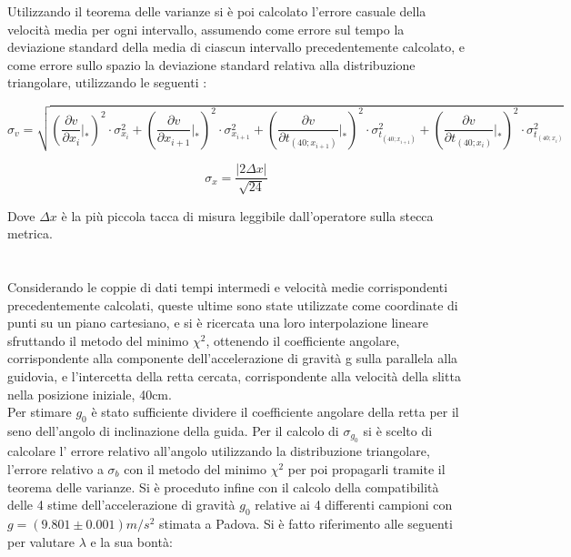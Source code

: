 \documentclass[a4paper,11pt,oneside]{article}
\begin{document}
Utilizzando il teorema delle varianze si è poi calcolato l'errore casuale della velocità media per ogni intervallo, assumendo come errore sul tempo la deviazione standard della media di ciascun intervallo precedentemente calcolato, e come errore sullo spazio la deviazione standard relativa alla distribuzione triangolare, utilizzando le seguenti :

\begin{equation*}\label{eq:propagazione_velocità}
    \sigma_{v}= \sqrt{
   \left( {\frac{\partial v}{\partial x_{i}}} \Big|_{\ast}\right)^{2} \cdot \sigma_{x_{i}}^2  +   
   \left( {\frac{\partial v}{\partial x_{i+1}}}\Big|_{\ast}\right )^{2} \cdot \sigma_{x_{i+1}}^2   +   
   \left( {\frac{\partial v}{\partial t_{\left(40; x_{i+1}\right)}}}\Big|_{\ast}\right)^{2}  \cdot \sigma_{t_{\left(40; x_{i+1}\right)}}^2 +   
       \left( {\frac{\partial v}{\partial t_{\left(40; x_i\right)}}}\Big|_{\ast}\right)^{2} \cdot  \sigma_{t_{\left(40; x_i\right)}}^2
    }
\end{equation*}

\begin{equation*}
\sigma_{x}=\frac{\mathopen|2\Delta x\mathclose|}{\sqrt{24}} 
\end{equation*}
 
Dove $\Delta x$ è la più piccola tacca di misura leggibile dall'operatore sulla stecca metrica.\\
\\
\\



Considerando le coppie di dati tempi intermedi e velocità medie corrispondenti precedentemente calcolati, queste ultime sono state utilizzate come coordinate di punti su un piano cartesiano, e si è ricercata una loro interpolazione lineare sfruttando il metodo del minimo ${\chi}^2$, ottenendo il coefficiente angolare, corrispondente alla componente dell'accelerazione di gravità g sulla parallela  alla guidovia, e l'intercetta della retta cercata, corrispondente alla velocità della slitta nella posizione iniziale, 40cm.\\
Per stimare $g_{0}$ è stato sufficiente dividere il coefficiente angolare della retta per il seno dell'angolo di inclinazione della guida.
Per il calcolo di $ \sigma_{g_{0}}$ si è scelto di calcolare l' errore relativo all'angolo utilizzando la distribuzione triangolare, l'errore relativo a $\sigma_b$ con il metodo del minimo ${\chi}^2$ per poi propagarli tramite il teorema delle varianze. Si è proceduto infine con il calcolo della compatibilità delle 4 stime dell'accelerazione di gravità $g_{0}$ relative ai 4 differenti campioni con $g=(9.801\pm 0.001)\si{m/s^2}$ stimata a Padova. Si è fatto riferimento alle seguenti per valutare  $\lambda$ e la sua bontà:
\end{document}
